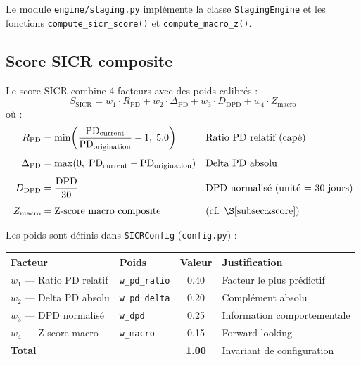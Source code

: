 \documentclass[12pt,a4paper]{article}
\begin{document}
Le module \texttt{engine/staging.py} impl\'emente la classe \texttt{StagingEngine} et les fonctions \texttt{compute\_sicr\_score()} et \texttt{compute\_macro\_z()}.

\subsection{Score SICR composite}

\begin{formulebox}
Le score SICR combine 4 facteurs avec des poids calibr\'es :
\begin{equation}
\label{eq:sicr}
S_{\text{SICR}} = w_1 \cdot R_{\text{PD}} + w_2 \cdot \Delta_{\text{PD}} + w_3 \cdot D_{\text{DPD}} + w_4 \cdot Z_{\text{macro}}
\end{equation}
o\`u :
\begin{align}
R_{\text{PD}} &= \min\!\left(\frac{\text{PD}_{\text{current}}}{\text{PD}_{\text{origination}}} - 1,\; 5.0\right) & &\text{Ratio PD relatif (cap\'e)} \label{eq:pd_ratio} \\[4pt]
\Delta_{\text{PD}} &= \max\!\left(0,\; \text{PD}_{\text{current}} - \text{PD}_{\text{origination}}\right) & &\text{Delta PD absolu} \\[4pt]
D_{\text{DPD}} &= \frac{\text{DPD}}{30} & &\text{DPD normalis\'e (unit\'e = 30 jours)} \\[4pt]
Z_{\text{macro}} &= \text{Z-score macro composite} & &\text{(cf. \S\ref{subsec:zscore})}
\end{align}
\end{formulebox}

Les poids sont d\'efinis dans \texttt{SICRConfig} (\texttt{config.py}) :

\begin{center}
\begin{tabular}{llcl}
\toprule
\textbf{Facteur} & \textbf{Poids} & \textbf{Valeur} & \textbf{Justification} \\
\midrule
$w_1$ --- Ratio PD relatif     & \texttt{w\_pd\_ratio} & 0.40 & Facteur le plus pr\'edictif \\
$w_2$ --- Delta PD absolu       & \texttt{w\_pd\_delta} & 0.20 & Compl\'ement absolu \\
$w_3$ --- DPD normalis\'e       & \texttt{w\_dpd}       & 0.25 & Information comportementale \\
$w_4$ --- Z-score macro          & \texttt{w\_macro}     & 0.15 & Forward-looking \\
\midrule
\textbf{Total} & & \textbf{1.00} & Invariant de configuration \\
\bottomrule
\end{tabular}
\end{center}
\end{document}
